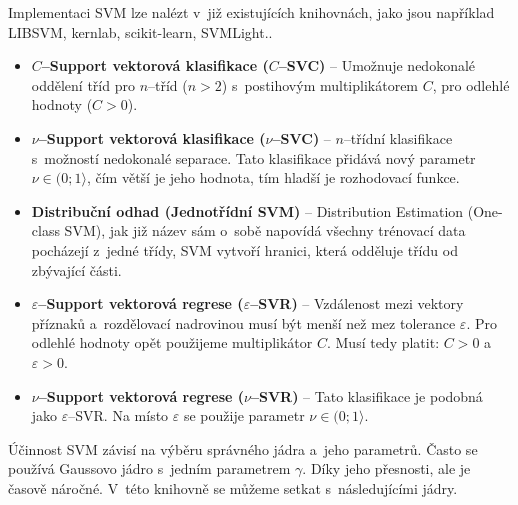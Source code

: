 Implementaci SVM lze nalézt v~již existujících knihovnách, jako jsou například LIBSVM, kernlab, scikit-learn, SVMLight.. 
\begin{itemize}
\item\textbf{$C$--Support vektorová klasifikace ($C$--SVC)} -- 
Umožnuje nedokonalé oddělení tříd pro $n$--tříd ($n > 2$) s~postihovým multiplikátorem $C$, pro odlehlé hodnoty ($C > 0$).
\item\textbf{$\nu$--Support vektorová klasifikace ($\nu$--SVC)} --
$n$--třídní klasifikace s~možností nedokonalé separace. Tato klasifikace přidává nový parametr $\nu \in (0;1\rangle$, čím větší je jeho hodnota, tím hladší je rozhodovací funkce. 
\item\textbf{Distribuční odhad (Jednotřídní SVM)} --
Distribution Estimation (One-class SVM), jak již název sám o~sobě napovídá všechny trénovací data pocházejí z~jedné třídy, SVM vytvoří hranici, která odděluje třídu od zbývající části.
\item\textbf{$\varepsilon$--Support vektorová regrese ($\varepsilon$--SVR)} --
Vzdálenost mezi vektory příznaků a~rozdělovací nadrovinou musí být menší než mez tolerance $\varepsilon$. Pro odlehlé hodnoty opět použijeme multiplikátor $C$. Musí tedy platit: $C > 0$ a~$\varepsilon > 0$. 
\item\textbf{$\nu$--Support vektorová regrese ($\nu$--SVR)} --
Tato klasifikace je podobná jako $\varepsilon$--SVR. Na místo $\varepsilon$ se použije parametr $\nu \in (0;1\rangle$. 
\end{itemize}
Účinnost SVM závisí na výběru správného jádra a~jeho parametrů. Často se používá Gaussovo jádro s~jedním parametrem $\gamma$. Díky jeho přesnosti, ale je časově náročné. V~této knihovně se můžeme setkat s~následujícími jádry.
